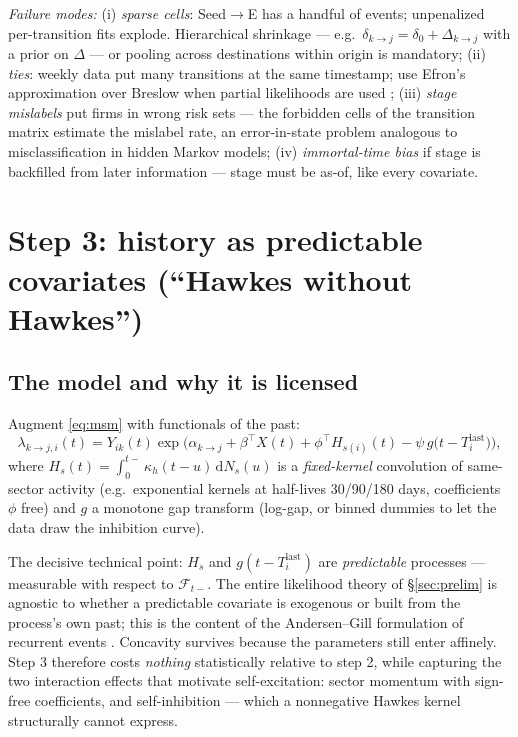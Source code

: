 \documentclass[11pt]{article}
\newcommand{\dd}{\,\mathrm{d}}
\newcommand{\cF}{\mathcal{F}}
\numberwithin{assumption}{section}
\numberwithin{proposition}{section}
\numberwithin{remark}{section}
\begin{document}
\emph{Failure modes:}
(i) \emph{sparse cells}: Seed$\to$E has a handful of events; unpenalized
per-transition fits explode. Hierarchical shrinkage --- e.g.\
$\delta_{k\to j}=\delta_0+\Delta_{k\to j}$ with a prior on $\Delta$ ---
or pooling across destinations within origin is mandatory;
(ii) \emph{ties}: weekly data put many transitions at the same timestamp;
use Efron's approximation over Breslow when partial likelihoods are used
\citep{efron1977};
(iii) \emph{stage mislabels} put firms in wrong risk sets --- the forbidden
cells of the transition matrix estimate the mislabel rate, an
error-in-state problem analogous to misclassification in hidden Markov
models;
(iv) \emph{immortal-time bias} if stage is backfilled from later
information --- stage must be as-of, like every covariate.

\section{Step 3: history as predictable covariates
(``Hawkes without Hawkes'')}
\label{sec:step3}

\subsection{The model and why it is licensed}
Augment \eqref{eq:msm} with functionals of the past:
\begin{equation}
\lambda_{k\to j,i}(t)=Y_{ik}(t)\exp\Big(
\alpha_{k\to j}+\beta^\top X(t)
+\phi^{\top} H_{s(i)}(t)
-\psi\, g\big(t-T_i^{\mathrm{last}}\big)\Big),
\label{eq:step3}
\end{equation}
where $H_s(t)=\int_0^{t-} \kappa_h(t-u)\dd N_s(u)$ is a
\emph{fixed-kernel} convolution of same-sector activity (e.g.\ exponential
kernels at half-lives 30/90/180 days, coefficients $\phi$ free) and $g$ a
monotone gap transform (log-gap, or binned dummies to let the data draw the
inhibition curve).

The decisive technical point: $H_s$ and $g(t-T^{\mathrm{last}}_i)$ are
\emph{predictable} processes --- measurable with respect to $\cF_{t-}$.
The entire likelihood theory of \S\ref{sec:prelim} is agnostic to whether a
predictable covariate is exogenous or built from the process's own past;
this is the content of the Andersen--Gill formulation of recurrent events
\citep{andersengill1982}. Concavity survives because the parameters still
enter affinely. Step 3 therefore costs \emph{nothing} statistically
relative to step 2, while capturing the two interaction effects that
motivate self-excitation:
sector momentum with sign-free coefficients, and self-inhibition --- which
a nonnegative Hawkes kernel structurally cannot express.
\end{document}
